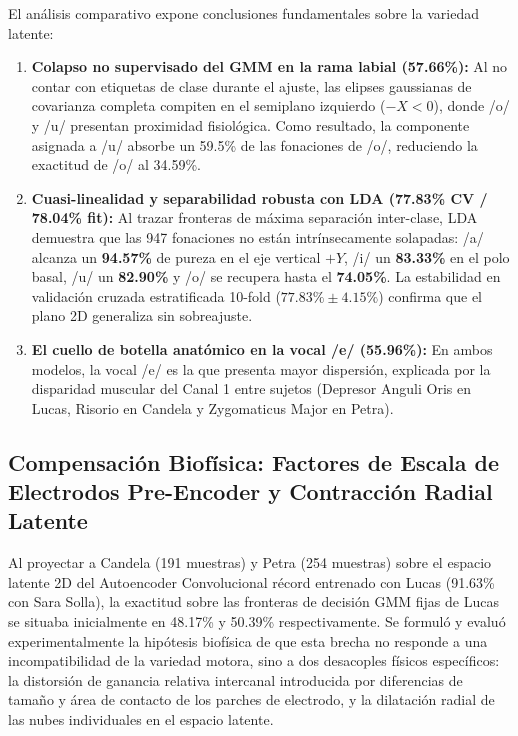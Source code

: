 \documentclass[11pt,a4paper]{article}
\begin{document}
El análisis comparativo expone conclusiones fundamentales sobre la variedad latente:
\begin{enumerate}
    \item \textbf{Colapso no supervisado del GMM en la rama labial (57.66\%):} Al no contar con etiquetas de clase durante el ajuste, las elipses gaussianas de covarianza completa compiten en el semiplano izquierdo ($-X < 0$), donde /o/ y /u/ presentan proximidad fisiológica. Como resultado, la componente asignada a /u/ absorbe un 59.5\% de las fonaciones de /o/, reduciendo la exactitud de /o/ al 34.59\%.
    \item \textbf{Cuasi-linealidad y separabilidad robusta con LDA (77.83\% CV / 78.04\% fit):} Al trazar fronteras de máxima separación inter-clase, LDA demuestra que las 947 fonaciones no están intrínsecamente solapadas: /a/ alcanza un \textbf{94.57\%} de pureza en el eje vertical $+Y$, /i/ un \textbf{83.33\%} en el polo basal, /u/ un \textbf{82.90\%} y /o/ se recupera hasta el \textbf{74.05\%}. La estabilidad en validación cruzada estratificada 10-fold ($77.83\% \pm 4.15\%$) confirma que el plano 2D generaliza sin sobreajuste.
    \item \textbf{El cuello de botella anatómico en la vocal /e/ (55.96\%):} En ambos modelos, la vocal /e/ es la que presenta mayor dispersión, explicada por la disparidad muscular del Canal 1 entre sujetos (Depresor Anguli Oris en Lucas, Risorio en Candela y Zygomaticus Major en Petra).
\end{enumerate}

\subsection{Compensación Biofísica: Factores de Escala de Electrodos Pre-Encoder y Contracción Radial Latente}
\label{subsec:compensacion_biofisica_electrodos_escala}

Al proyectar a Candela (191 muestras) y Petra (254 muestras) sobre el espacio latente 2D del Autoencoder Convolucional récord entrenado con Lucas (91.63\% con Sara Solla), la exactitud sobre las fronteras de decisión GMM fijas de Lucas se situaba inicialmente en 48.17\% y 50.39\% respectivamente. Se formuló y evaluó experimentalmente la hipótesis biofísica de que esta brecha no responde a una incompatibilidad de la variedad motora, sino a dos desacoples físicos específicos: la distorsión de ganancia relativa intercanal introducida por diferencias de tamaño y área de contacto de los parches de electrodo, y la dilatación radial de las nubes individuales en el espacio latente.
\end{document}
